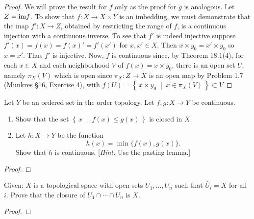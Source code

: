 \begin{proof}
We will prove the result for $f$ only as the proof for $g$ is
analogous. Let $Z=\mathrm{im} f$. To show that $f\colon X\to X\times Y$
is an imbedding, we must demonstrate that the map $f'\colon X\to
Z$, obtained by restricting the range of $f$, is a continuous
injection with a continuous inverse. To see that $f'$ is indeed
injective suppose $f'(x)=f(x)=f(x)'=f'(x')$ for $x,x'\in X$. Then
$x\times y_0=x'\times y_0$ so $x=x'$. Thus $f'$ is
injective. Now, $f$ is continuous since, by Theorem 18.1(4), for
each $x\in X$ and each neighborhood $V$ of $f(x)=x\times y_0$,
there is an open set $U$, namely $\pi_X(V)$ which is open since
$\pi_X\colon Z\to X$ is an open map by Problem 1.7 (Munkres
\S16, Exercise 4), with $f(U)=\left\{\,x\times
  y_0\;\middle|\;x\in\pi_X(V)\,\right\}\subset V$
\end{proof}
\newpage
\begin{problem}[Munkres \S18, p.\,111-112, 8(a,b)]
Let $Y$ be an ordered set in the order topology. Let
$f,g\colon X\to Y$ be continuous.
\begin{enumerate}[noitemsep,label=(\alph*)]
\item Show that the set
  $\left\{\,x\;\middle|\;f(x)\leq g(x)\,\right\}$ is closed in $X$.
\item Let $h\colon X\to Y$ be the
  function \[h(x)=\min\{f(x),g(x)\}.\] Show that $h$ is
  continuous. [\emph{Hint:} Use the pasting lemma.]
\end{enumerate}
\end{problem}
\begin{proof}

\end{proof}
\newpage
\begin{problem}
Given: $X$ is a topological space with open sets $U_1,...,U_n$
such that $\bar U_i=X$ for all $i$. Prove that the closure of
$U_1\cap\cdots\cap U_n$ is $X$.
\end{problem}
\begin{proof}
\end{proof}

